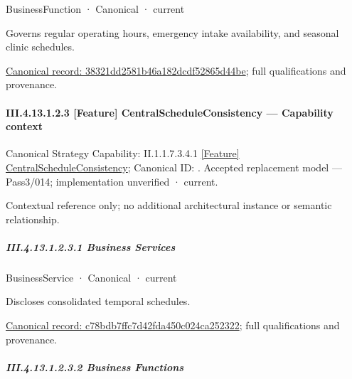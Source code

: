 \label{element:38321dd2581b46a182dcdf52865d44be}
{\small BusinessFunction · Canonical · current}\par

Governs regular operating hours, emergency intake availability, and seasonal clinic schedules.


{\footnotesize \href{../../../../../../../../continuum/business/business-function/38321dd2581b46a182dcdf52865d44be.md}{Canonical record: 38321dd2581b46a182dcdf52865d44be}; full qualifications and provenance.}\par
\paragraph*{III.4.13.1.2.3 [Feature] CentralScheduleConsistency — Capability context}
\label{navigation:III.4.13.1.2.3}

{\small Canonical Strategy Capability: II.1.1.7.3.4.1 \hyperref[element:5a39c3923f0e4e079acf913126754075]{[Feature] CentralScheduleConsistency}; Canonical ID: \texttt{}. Accepted replacement model — Pass3/014; implementation unverified · current.}\par
Contextual reference only; no additional architectural instance or semantic relationship.\par
\subparagraph*{III.4.13.1.2.3.1 Business Services}
\label{navigation:III.4.13.1.2.3.1}

\label{navigation:III.4.13.1.2.3.1.1}

\label{element:c78bdb7ffc7d42fda450c024ca252322}
{\small BusinessService · Canonical · current}\par

Discloses consolidated temporal schedules.


{\footnotesize \href{../../../../../../../../continuum/business/business-service/c78bdb7ffc7d42fda450c024ca252322.md}{Canonical record: c78bdb7ffc7d42fda450c024ca252322}; full qualifications and provenance.}\par
\subparagraph*{III.4.13.1.2.3.2 Business Functions}
\label{navigation:III.4.13.1.2.3.2}

